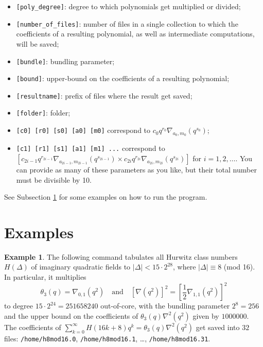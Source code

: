 \documentclass[a4paper,10pt]{article}
\newcommand{\code}{\lstinline}
\begin{document}
\begin{itemize}
\item \code{[poly_degree]}: degree to which polynomials get multiplied or divided;

\item \code{[number_of_files]}: number of files in a single collection to which the coefficients of a resulting polynomial, as well as intermediate computations, will be saved;

\item \code{[bundle]}: bundling parameter;

\item \code{[bound]}: upper-bound on the coefficients of a resulting polynomial;

\item \code{[resultname]}: prefix of files where the result get saved;

\item \code{[folder]}: folder;

\item \code{[c0] [r0] [s0] [a0] [m0]} correspond to $c_0q^{r_0}\nabla_{a_0, m_0}(q^{s_0})$;

\item \code{[c1] [r1] [s1] [a1] [m1] ...} correspond to $\left[c_{2i - 1}q^{r_{2i - 1}}\nabla_{a_{2i - 1}, m_{2i - 1}}(q^{s_{2i - 1}}) \times c_{2i}q^{r_{2i}}\nabla_{a_{2i}, m_{2i}}(q^{s_{2i}})\right]$ for $i = 1, 2, \ldots$. You can provide as many of these parameters as you like, but their total number must be divisible by 10.
\end{itemize}

See Subsection \ref{sec:polymult_examples} for some examples on how to run the program.

\section{Examples} \label{sec:polymult_examples}

\textbf{Example 1}. The following command tabulates all Hurwitz class numbers $H(\Delta)$ of imaginary quadratic fields to $|\Delta| < 15 \cdot 2^{28}$, where $|\Delta| \equiv 8$ (mod 16). In particular, it multiplies
%
$$
\theta_3(q) = \nabla_{0, 1}(q^2) \quad \text{and} \quad \left[\nabla(q^2)\right]^2 = \left[\frac{1}{2}\nabla_{1, 1}(q^2)\right]^2
%
$$
to degree $15 \cdot 2^{24} = 251658240$ out-of-core, with the bundling parameter $2^8=256$ and the upper bound on the coefficients of $\theta_3(q)\nabla^2(q^2)$ given by $1000000$. The coefficients of $\sum_{k = 0}^\infty H(16k + 8)q^k = \theta_3(q)\nabla^2(q^2)$ get saved into $32$ files: \code{/home/h8mod16.0}, \code{/home/h8mod16.1}, \ldots, \code{/home/h8mod16.31}.
\end{document}
